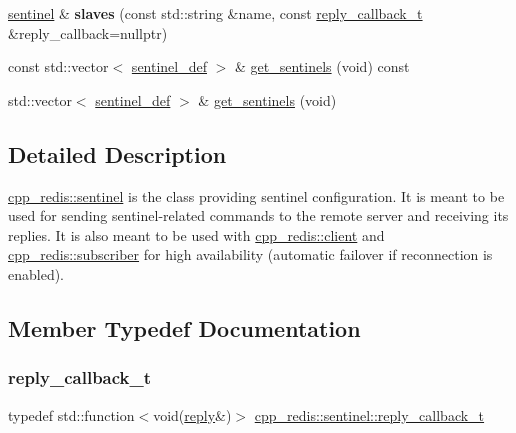 \begin{DoxyCompactItemize}
\item 
\mbox{\label{classcpp__redis_1_1sentinel_aa4b19659807388d276764f9a79132d00}} 
\mbox{\hyperlink{classcpp__redis_1_1sentinel}{sentinel}} \& {\bfseries slaves} (const std\+::string \&name, const \mbox{\hyperlink{classcpp__redis_1_1sentinel_ae1a150ff8787208c47414397a061c9a7}{reply\+\_\+callback\+\_\+t}} \&reply\+\_\+callback=nullptr)
\item 
const std\+::vector$<$ \mbox{\hyperlink{classcpp__redis_1_1sentinel_1_1sentinel__def}{sentinel\+\_\+def}} $>$ \& \mbox{\hyperlink{classcpp__redis_1_1sentinel_adec98cdde0500e44b8fda26a44f14b49}{get\+\_\+sentinels}} (void) const
\item 
std\+::vector$<$ \mbox{\hyperlink{classcpp__redis_1_1sentinel_1_1sentinel__def}{sentinel\+\_\+def}} $>$ \& \mbox{\hyperlink{classcpp__redis_1_1sentinel_a62cc14b7795d746cc7d0053c1e0a3abd}{get\+\_\+sentinels}} (void)
\end{DoxyCompactItemize}


\subsection{Detailed Description}
\mbox{\hyperlink{classcpp__redis_1_1sentinel}{cpp\+\_\+redis\+::sentinel}} is the class providing sentinel configuration. It is meant to be used for sending sentinel-\/related commands to the remote server and receiving its replies. It is also meant to be used with \mbox{\hyperlink{classcpp__redis_1_1client}{cpp\+\_\+redis\+::client}} and \mbox{\hyperlink{classcpp__redis_1_1subscriber}{cpp\+\_\+redis\+::subscriber}} for high availability (automatic failover if reconnection is enabled). 

\subsection{Member Typedef Documentation}
\mbox{\label{classcpp__redis_1_1sentinel_ae1a150ff8787208c47414397a061c9a7}} 
\subsubsection{\texorpdfstring{reply\+\_\+callback\+\_\+t}{reply\_callback\_t}}
{\footnotesize\ttfamily typedef std\+::function$<$void(\mbox{\hyperlink{classcpp__redis_1_1reply}{reply}}\&)$>$ \mbox{\hyperlink{classcpp__redis_1_1sentinel_ae1a150ff8787208c47414397a061c9a7}{cpp\+\_\+redis\+::sentinel\+::reply\+\_\+callback\+\_\+t}}}


